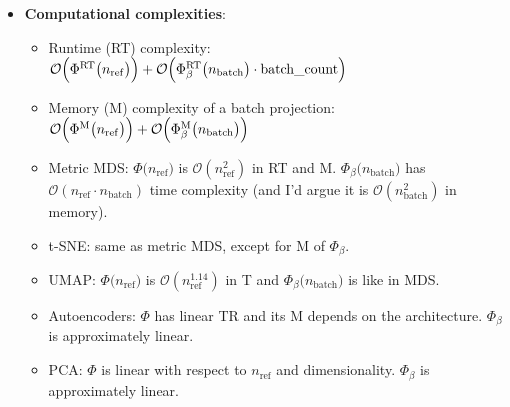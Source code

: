 \documentclass[a4paper,12pt]{article}
\begin{document}
\begin{itemize}
    \item \textbf{Computational complexities}:
    \begin{itemize}
        \item Runtime (RT) complexity:
        $\mathcal{O}\Bigl(\Phi^{\mathrm{RT}}\bigl(n_{\mathrm{ref}}\bigr)\Bigr)
        +\mathcal{O}\Bigl(\Phi_\beta^{\mathrm{RT}}\bigl(n_{\mathrm{batch}}\bigr)
        \cdot \text{batch\_count}\Bigr)$
        \item Memory (M) complexity of a batch projection:
        $\mathcal{O}\Bigl(\Phi^{\mathrm{M}}\bigl(n_{\mathrm{ref}}\bigr)\Bigr)
        +\mathcal{O}\Bigl(\Phi_\beta^{\mathrm{M}}\bigl(n_{\mathrm{batch}}\bigr)\Bigr)$
        \item Metric MDS: $\Phi\bigl(n_{\mathrm{ref}}\bigr)$ is $\mathcal{O}(n_{\mathrm{ref}}^2)$ in RT and M. $\Phi_{\beta}\bigl(n_{\mathrm{batch}}\bigr)$ has $\mathcal{O}(n_{\mathrm{ref}} \cdot n_{\mathrm{batch}})$ time complexity (and I'd argue it is $\mathcal{O}(n_{\mathrm{batch}}^2)$ in memory).
        \item t-SNE: same as metric MDS, except for M of $\Phi_{\beta}$.
        \item UMAP: $\Phi\bigl(n_{\mathrm{ref}}\bigr)$ is $\mathcal{O}(n_{\mathrm{ref}}^{1.14})$ in T and $\Phi_{\beta}\bigl(n_{\mathrm{batch}}\bigr)$ is like in MDS.
        \item Autoencoders: $\Phi$ has linear TR and its M depends on the architecture. $\Phi_{\beta}$ is approximately linear.
        \item PCA: $\Phi$ is linear with respect to $n_{\mathrm{ref}}$ and dimensionality. $\Phi_{\beta}$ is approximately linear.
    \end{itemize}


\end{itemize}
\end{document}
